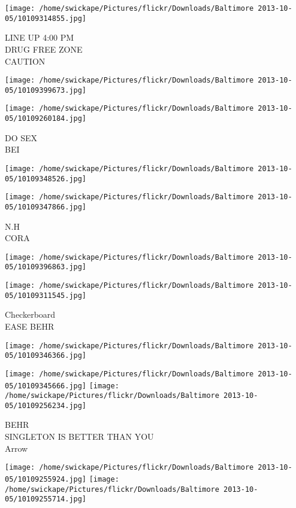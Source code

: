 \documentclass[10pt,letterpaper]{article}
\begin{document}
\texttt{[image: /home/swickape/Pictures/flickr/Downloads/Baltimore 2013-10-05/10109314855.jpg]}

LINE UP 4:00 PM\\
DRUG FREE ZONE\\
CAUTION
\pagebreak

\texttt{[image: /home/swickape/Pictures/flickr/Downloads/Baltimore 2013-10-05/10109399673.jpg]}

\vspace{0.25in}
\texttt{[image: /home/swickape/Pictures/flickr/Downloads/Baltimore 2013-10-05/10109260184.jpg]}

DO SEX\\
BEI
\pagebreak

\texttt{[image: /home/swickape/Pictures/flickr/Downloads/Baltimore 2013-10-05/10109348526.jpg]}

\vspace{0.25in}
\texttt{[image: /home/swickape/Pictures/flickr/Downloads/Baltimore 2013-10-05/10109347866.jpg]}

N.H\\
CORA
\pagebreak

\texttt{[image: /home/swickape/Pictures/flickr/Downloads/Baltimore 2013-10-05/10109396863.jpg]}

\vspace{0.25in}
\texttt{[image: /home/swickape/Pictures/flickr/Downloads/Baltimore 2013-10-05/10109311545.jpg]}

Checkerboard\\
EASE BEHR
\pagebreak

\texttt{[image: /home/swickape/Pictures/flickr/Downloads/Baltimore 2013-10-05/10109346366.jpg]}

\vspace{0.25in}
\texttt{[image: /home/swickape/Pictures/flickr/Downloads/Baltimore 2013-10-05/10109345666.jpg]}
\texttt{[image: /home/swickape/Pictures/flickr/Downloads/Baltimore 2013-10-05/10109256234.jpg]}

BEHR\\
SINGLETON IS BETTER THAN YOU\\
Arrow
\pagebreak

\texttt{[image: /home/swickape/Pictures/flickr/Downloads/Baltimore 2013-10-05/10109255924.jpg]}
\texttt{[image: /home/swickape/Pictures/flickr/Downloads/Baltimore 2013-10-05/10109255714.jpg]}
\end{document}
